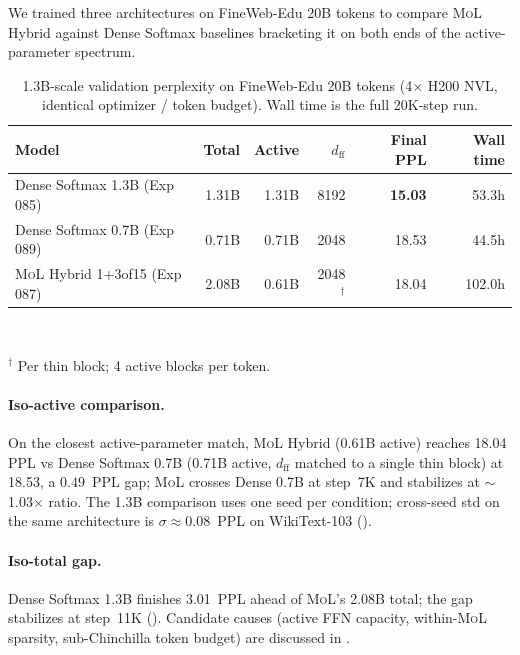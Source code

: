 \documentclass[10pt]{article}
\newcommand{\mol}{\textsc{MoL}}
\begin{document}
We trained three architectures on FineWeb-Edu 20B tokens to compare \mol{} Hybrid against Dense Softmax baselines bracketing it on both ends of the active-parameter spectrum.

\begin{table}[h]
\centering
\caption{1.3B-scale validation perplexity on FineWeb-Edu 20B tokens (4$\times$ H200 NVL, identical optimizer / token budget). Wall time is the full 20K-step run.}
\label{tab:1p3b_headline}
\small
\begin{tabular}{lrrrrr}
\toprule
Model & Total & Active & $d_\textrm{ff}$ & Final PPL & Wall time \\
\midrule
Dense Softmax 1.3B (Exp 085)        & 1.31B & 1.31B & 8192 & \textbf{15.03} & 53.3h \\
Dense Softmax 0.7B (Exp 089)        & 0.71B & 0.71B & 2048 & 18.53 & 44.5h \\
\mol{} Hybrid 1+3of15 (Exp 087)     & 2.08B & 0.61B & 2048$^\dagger$ & 18.04 & 102.0h \\
\bottomrule
\end{tabular}
\\[2pt]
\raggedright\footnotesize $^\dagger$ Per thin block; 4 active blocks per token.
\end{table}

\paragraph{Iso-active comparison.} On the closest active-parameter match, \mol{} Hybrid (0.61B active) reaches 18.04 PPL vs Dense Softmax 0.7B (0.71B active, $d_\textrm{ff}$ matched to a single thin block) at 18.53, a $0.49$~PPL gap; \mol{} crosses Dense 0.7B at step~7K and stabilizes at $\sim$1.03$\times$ ratio. The 1.3B comparison uses one seed per condition; cross-seed std on the same architecture is $\sigma{\approx}0.08$~PPL on WikiText-103 ().

\paragraph{Iso-total gap.} Dense Softmax 1.3B finishes 3.01~PPL ahead of \mol{}'s 2.08B total; the gap stabilizes at step~11K (). Candidate causes (active FFN capacity, within-\mol{} sparsity, sub-Chinchilla token budget) are discussed in .
\end{document}

